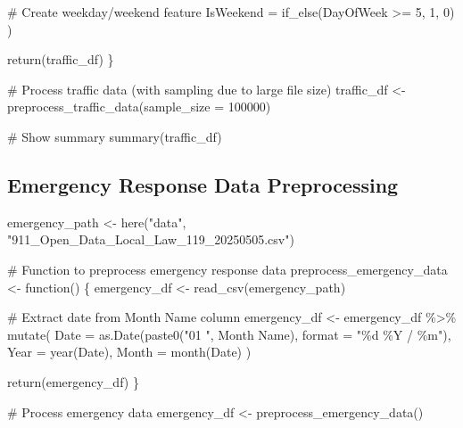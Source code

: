 \documentclass[
  letterpaper,
  DIV=11,
  numbers=noendperiod]{scrreprt}
\newenvironment{Shaded}{\begin{snugshade}}{\end{snugshade}}
\newcommand{\AttributeTok}[1]{\textcolor[rgb]{0.40,0.45,0.13}{#1}}
\newcommand{\CommentTok}[1]{\textcolor[rgb]{0.37,0.37,0.37}{#1}}
\newcommand{\ControlFlowTok}[1]{\textcolor[rgb]{0.00,0.23,0.31}{#1}}
\newcommand{\DecValTok}[1]{\textcolor[rgb]{0.68,0.00,0.00}{#1}}
\newcommand{\FunctionTok}[1]{\textcolor[rgb]{0.28,0.35,0.67}{#1}}
\newcommand{\NormalTok}[1]{\textcolor[rgb]{0.00,0.23,0.31}{#1}}
\newcommand{\OtherTok}[1]{\textcolor[rgb]{0.00,0.23,0.31}{#1}}
\newcommand{\SpecialCharTok}[1]{\textcolor[rgb]{0.37,0.37,0.37}{#1}}
\newcommand{\StringTok}[1]{\textcolor[rgb]{0.13,0.47,0.30}{#1}}
\begin{document}
\begin{Shaded}
\begin{Highlighting}[]
      \CommentTok{\# Create weekday/weekend feature}
      \AttributeTok{IsWeekend =} \FunctionTok{if\_else}\NormalTok{(DayOfWeek }\SpecialCharTok{\textgreater{}=} \DecValTok{5}\NormalTok{, }\DecValTok{1}\NormalTok{, }\DecValTok{0}\NormalTok{)}
\NormalTok{    )}
  
  \FunctionTok{return}\NormalTok{(traffic\_df)}
\NormalTok{\}}

\CommentTok{\# Process traffic data (with sampling due to large file size)}
\NormalTok{traffic\_df }\OtherTok{\textless{}{-}} \FunctionTok{preprocess\_traffic\_data}\NormalTok{(}\AttributeTok{sample\_size =} \DecValTok{100000}\NormalTok{)}

\CommentTok{\# Show summary}
\FunctionTok{summary}\NormalTok{(traffic\_df)}
\end{Highlighting}
\end{Shaded}

\subsection{Emergency Response Data
Preprocessing}\label{emergency-response-data-preprocessing}

\begin{Shaded}
\begin{Highlighting}[]
\NormalTok{emergency\_path }\OtherTok{\textless{}{-}} \FunctionTok{here}\NormalTok{(}\StringTok{"data"}\NormalTok{, }\StringTok{"911\_Open\_Data\_Local\_Law\_119\_20250505.csv"}\NormalTok{)}

\CommentTok{\# Function to preprocess emergency response data}
\NormalTok{preprocess\_emergency\_data }\OtherTok{\textless{}{-}} \ControlFlowTok{function}\NormalTok{() \{}
\NormalTok{  emergency\_df }\OtherTok{\textless{}{-}} \FunctionTok{read\_csv}\NormalTok{(emergency\_path)}
  
  \CommentTok{\# Extract date from \textquotesingle{}Month Name\textquotesingle{} column}
\NormalTok{  emergency\_df }\OtherTok{\textless{}{-}}\NormalTok{ emergency\_df }\SpecialCharTok{\%\textgreater{}\%}
    \FunctionTok{mutate}\NormalTok{(}
      \AttributeTok{Date =} \FunctionTok{as.Date}\NormalTok{(}\FunctionTok{paste0}\NormalTok{(}\StringTok{"01 "}\NormalTok{, }\StringTok{\textasciigrave{}}\AttributeTok{Month Name}\StringTok{\textasciigrave{}}\NormalTok{), }\AttributeTok{format =} \StringTok{"\%d \%Y / \%m"}\NormalTok{),}
      \AttributeTok{Year =} \FunctionTok{year}\NormalTok{(Date),}
      \AttributeTok{Month =} \FunctionTok{month}\NormalTok{(Date)}
\NormalTok{    )}
  
  \FunctionTok{return}\NormalTok{(emergency\_df)}
\NormalTok{\}}

\CommentTok{\# Process emergency data}
\NormalTok{emergency\_df }\OtherTok{\textless{}{-}} \FunctionTok{preprocess\_emergency\_data}\NormalTok{()}
\end{Highlighting}
\end{Shaded}
\end{document}

